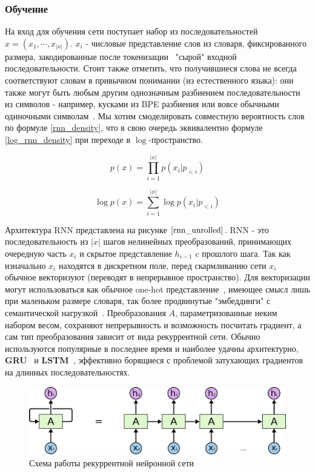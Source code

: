 \documentclass{spbau-diploma}
\begin{document}
\subsubsection{Обучение}
На вход для обучения сети поступает набор из последовательностей 
$x = (x_1, \cdots, x_{|x|})$. $x_i$ - числовые представление слов из словаря,
фиксированного размера, закодированные 
после токенизации~\cite{wiki:token} "сырой" входной последовательности. Стоит
также отметить, что получившиеся слова не всегда соответствуют словам в 
привычном понимании (из естественного языка): они также могут быть любым другим
однозначным разбиением последовательности из символов - например, кусками из BPE
разбиения или вовсе обычными одиночными символам~\cite{1508.07909, charnn}. Мы 
хотим смоделировать совместную вероятность слов по формуле \ref{rnn_density}, 
что в свою очередь эквивалентно формуле \ref{log_rnn_density} при переходе в 
$\log$-пространство.

\begin{equation}
\label{rnn_density}
p(x) = \prod^{|x|}_{i=1}{p(x_i | p_{<i})}
\end{equation}

\begin{equation}
\label{log_rnn_density}
\log p(x) = \sum\limits^{|x|}_{i=1}{\log p(x_i | p_{<i})}
\end{equation}

Архитектура RNN представлена на рисунке $\ref{rnn_unrolled}$. RNN - это 
последовательность из $|x|$ шагов нелинейных преобразований, принимающих 
очередную часть $x_i$ и скрытое представление $h_{i-1}$ c прошлого шага. Так как
изначально $x_i$ находятся в дискретном поле, перед скармливанию сети $x_i$ 
обычное векторизуют (переводят в непрерывное пространство). Для векторизации 
могут использоваться как обычное one-hot представление~\cite{onehot}, имеющее
смысл лишь при маленьком размере словаря, так более продвинутые "эмбеддинги" с 
семантической нагрузкой~\cite{word2vec, glove, elmo}. 
Преобразования $A$, параметризованные неким набором весом, сохраняют 
непрерывность и возможность посчитать градиент, а сам тип преобразования 
зависит от вида рекуррентной сети. Обычно используются популярные в последнее 
время и наиболее удачны архитектурно, \textbf{GRU}~\cite{1412.3555} и 
\textbf{LSTM}~\cite{lstm}, эффективно борящиеся с проблемой затухающих 
градиентов на длинных последовательностях.

\begin{figure}[H]
\centering
\includegraphics[width=\textwidth]{images/rnn_unrolled.png}
\caption{Схема работы рекуррентной нейронной сети~\cite{medium:rnn}}
\label{rnn_unrolled}
\end{figure}
\end{document}
